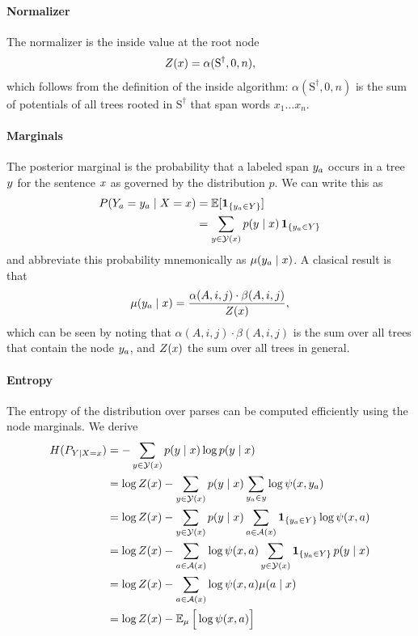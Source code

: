   \paragraph{Normalizer}
    The normalizer is the inside value at the root node
    \begin{align}
      Z(x) = \alpha(\text{S}^{\dagger}, 0, n),
    \end{align}
    which follows from the definition of the inside algorithm: $\alpha(\text{S}^{\dagger}, 0, n)$ is the sum of potentials of all trees rooted in $\text{S}^{\dagger}$ that span words $x_1 \dots x_n$.

  \paragraph{Marginals}
    The posterior marginal is the probability that a labeled span $y_a$ occurs in a tree $y$ for the sentence $x$ as governed by the distribution $p$. We can write this as
    \begin{align}
      P(Y_a = y_a \mid X = x)
        &= \operatorname{\mathbb{E}}[ \operatorname{\mathbf{1}}_{ \{ y_a \in Y \} } ]  \\
        &= \sum_{ y \in \mathcal{Y}(x) } p(y \mid x) \operatorname{\mathbf{1}}_{ \{ y_a \in Y \} }
    \end{align}
    and abbreviate this probability mnemonically as $\mu(y_a \mid x)$. A clasical result is that
    \begin{align}
      \mu(y_a \mid x) = \frac{\alpha(A, i, j) \cdot \beta(A, i, j)}{Z(x)},
    \end{align}
    which can be seen by noting that $\alpha(A, i, j) \cdot \beta(A, i, j)$ is the sum over all trees that contain the node $y_a$, and $Z(x)$ the sum over all trees in general.

  \paragraph{Entropy}
    The entropy of the distribution over parses can be computed efficiently using the node marginals. We derive
    \begin{align*}
      H(P_{Y \vert X = x})
        &= - \sum_{ y \in \mathcal{Y}(x) } p(y \mid x) \log p(y \mid x)  \\
        &= \log Z(x) - \sum_{ y \in \mathcal{Y}(x) } p(y \mid x) \sum_{y_a \in y} \log \psi(x, y_a)  \\
        &= \log Z(x) - \sum_{ y \in \mathcal{Y}(x) } p(y \mid x) \sum_{ a \in \mathcal{A}(x) } \operatorname{\mathbf{1}}_{ \{ y_a \in Y \} } \log \psi(x, a)  \\
        &= \log Z(x) - \sum_{ a \in \mathcal{A}(x) } \log \psi(x, a)  \sum_{ y \in \mathcal{Y}(x) } \operatorname{\mathbf{1}}_{ \{ y_a \in Y \} } p(y \mid x)  \\
        &= \log Z(x) - \sum_{ a \in \mathcal{A}(x) } \log \psi(x, a)  \mu(a \mid x)  \\
        &=  \log Z(x) - \operatorname{\mathbb{E}}_{ \mu } \Big[ \log \psi(x, a) \Big]  \\
    \end{align*}

